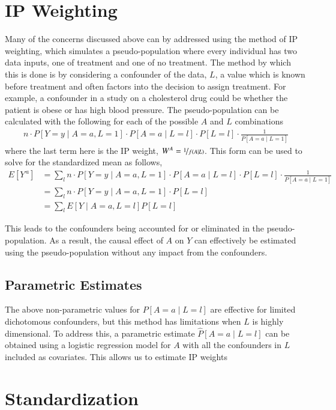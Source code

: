\section{IP Weighting} 
Many of the concerns discussed above can by addressed using the method of IP weighting, which simulates a pseudo-population where every individual has two data inputs, one of treatment and one of no treatment.  The method by which this is done is by considering a confounder of the data, $L$, a value which is known before treatment and often factors into the decision to assign treatment.  For example, a confounder in a study on a cholesterol drug could be whether the patient is obese or has high blood pressure.  The pseudo-population can be calculated with the following for each of the possible $A$ and $L$ combinations 
\begin{align} n\cdot P[Y=y \mid A = a, L= 1] \cdot P[A=a \mid L=l]  \cdot P[L=l] \cdot \frac{1}{P[A = a \mid L = 1]} \end{align}  
where the last term here is the IP weight, $W^{A} = \nicefrac{1}{f(A\mid L)}$.  This form can be used to solve for the standardized mean as follows, 
\begin{align} 
E[Y^{\,a}] &= \sum_l n \cdot P[Y=y \mid A = a, L= 1] \cdot P[A=a \mid L=l]  \cdot P[L=l] \cdot \frac{1}{P[A = a \mid L = 1]} \\ 
&=  \sum_l n \cdot P[Y=y \mid A = a, L= 1] \cdot P[L=l]\\ 
&= \sum_l E[Y \mid A=a, L= l] P[L=l] 
\end{align} 

This leads to the confounders being accounted for or eliminated in the pseudo-population.  As a result, the causal effect of $A$ on $Y$ can effectively be estimated using the pseudo-population without any impact from the confounders.  

\subsection{Parametric Estimates} 
The above non-parametric values for $P[A=a\mid L=l]$ are effective for limited dichotomous confounders, but this method has limitations when $L$ is highly dimensional.  To address this, a parametric estimate $\widehat{P}[A=a\mid L=l]$ can be obtained using a logistic regression model for $A$ with all the confounders in $L$ included as covariates.  This allows us to estimate IP weights 

\section{Standardization} 

